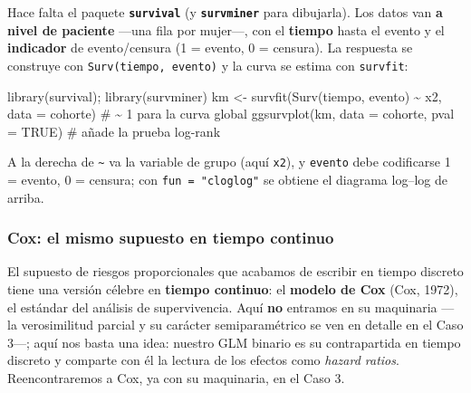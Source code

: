 \documentclass[
  letterpaper,
  DIV=11,
  numbers=noendperiod]{scrartcl}
\newenvironment{Shaded}{\begin{snugshade}}{\end{snugshade}}
\newcommand{\AttributeTok}[1]{\textcolor[rgb]{0.40,0.45,0.13}{#1}}
\newcommand{\CommentTok}[1]{\textcolor[rgb]{0.37,0.37,0.37}{#1}}
\newcommand{\ConstantTok}[1]{\textcolor[rgb]{0.56,0.35,0.01}{#1}}
\newcommand{\FunctionTok}[1]{\textcolor[rgb]{0.28,0.35,0.67}{#1}}
\newcommand{\NormalTok}[1]{\textcolor[rgb]{0.00,0.23,0.31}{#1}}
\newcommand{\OtherTok}[1]{\textcolor[rgb]{0.00,0.23,0.31}{#1}}
\newcommand{\SpecialCharTok}[1]{\textcolor[rgb]{0.37,0.37,0.37}{#1}}
\begin{document}
\begin{tcolorbox}[enhanced jigsaw, coltitle=black, rightrule=.15mm, arc=.35mm, leftrule=.75mm, colback=white, colbacktitle=quarto-callout-tip-color!10!white, left=2mm, breakable, toptitle=1mm, toprule=.15mm, bottomtitle=1mm, titlerule=0mm, title=\textcolor{quarto-callout-tip-color}{\faLightbulb}\hspace{0.5em}{🔧 En R. Estimar y dibujar la curva de Kaplan--Meier}, bottomrule=.15mm, opacityback=0, opacitybacktitle=0.6, colframe=quarto-callout-tip-color-frame]

Hace falta el paquete \textbf{\texttt{survival}} (y
\textbf{\texttt{survminer}} para dibujarla). Los datos van \textbf{a
nivel de paciente} ---una fila por mujer---, con el \textbf{tiempo}
hasta el evento y el \textbf{indicador} de evento/censura (1 = evento, 0
= censura). La respuesta se construye con \texttt{Surv(tiempo,\ evento)}
y la curva se estima con \texttt{survfit}:

\begin{Shaded}
\begin{Highlighting}[]
\FunctionTok{library}\NormalTok{(survival); }\FunctionTok{library}\NormalTok{(survminer)}
\NormalTok{km }\OtherTok{\textless{}{-}} \FunctionTok{survfit}\NormalTok{(}\FunctionTok{Surv}\NormalTok{(tiempo, evento) }\SpecialCharTok{\textasciitilde{}}\NormalTok{ x2, }\AttributeTok{data =}\NormalTok{ cohorte)  }\CommentTok{\# \textasciitilde{} 1 para la curva global}
\FunctionTok{ggsurvplot}\NormalTok{(km, }\AttributeTok{data =}\NormalTok{ cohorte, }\AttributeTok{pval =} \ConstantTok{TRUE}\NormalTok{)               }\CommentTok{\# añade la prueba log{-}rank}
\end{Highlighting}
\end{Shaded}

A la derecha de \texttt{\textasciitilde{}} va la variable de grupo (aquí
\texttt{x2}), y \texttt{evento} debe codificarse 1 = evento, 0 =
censura; con \texttt{fun\ =\ "cloglog"} se obtiene el diagrama log--log
de arriba.

\end{tcolorbox}

\hypertarget{sec-u15-cox}{%
\subsubsection{Cox: el mismo supuesto en tiempo
continuo}\label{sec-u15-cox}}

El supuesto de riesgos proporcionales que acabamos de escribir en tiempo
discreto tiene una versión célebre en \textbf{tiempo continuo}: el
\textbf{modelo de Cox} (Cox, 1972), el estándar del análisis de
supervivencia. Aquí \textbf{no} entramos en su maquinaria ---la
verosimilitud parcial y su carácter semiparamétrico se ven en detalle en
el Caso 3---; aquí nos basta una idea: nuestro GLM binario es su
contrapartida en tiempo discreto y comparte con él la lectura de los
efectos como \emph{hazard ratios}. Reencontraremos a Cox, ya con su
maquinaria, en el Caso 3.
\end{document}
